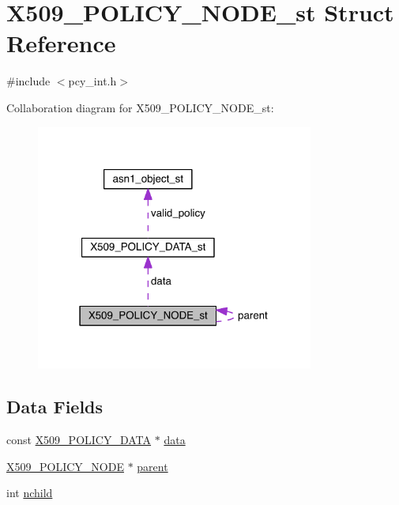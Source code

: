 \hypertarget{struct_x509___p_o_l_i_c_y___n_o_d_e__st}{}\section{X509\+\_\+\+P\+O\+L\+I\+C\+Y\+\_\+\+N\+O\+D\+E\+\_\+st Struct Reference}
\label{struct_x509___p_o_l_i_c_y___n_o_d_e__st}


{\ttfamily \#include $<$pcy\+\_\+int.\+h$>$}



Collaboration diagram for X509\+\_\+\+P\+O\+L\+I\+C\+Y\+\_\+\+N\+O\+D\+E\+\_\+st\+:\nopagebreak
\begin{figure}[H]
\begin{center}
\leavevmode
\includegraphics[width=259pt]{struct_x509___p_o_l_i_c_y___n_o_d_e__st__coll__graph}
\end{center}
\end{figure}
\subsection*{Data Fields}
\begin{DoxyCompactItemize}
\item 
const \hyperlink{pcy__int_8h_a0a96e7c084ee8bfa265612987136abd0}{X509\+\_\+\+P\+O\+L\+I\+C\+Y\+\_\+\+D\+A\+TA} $\ast$ \hyperlink{struct_x509___p_o_l_i_c_y___n_o_d_e__st_acc47c86faba298383084674e1f66ba39}{data}
\item 
\hyperlink{crypto_2ossl__typ_8h_a4fbb35756a73b47a3c4c86b5a6869f4d}{X509\+\_\+\+P\+O\+L\+I\+C\+Y\+\_\+\+N\+O\+DE} $\ast$ \hyperlink{struct_x509___p_o_l_i_c_y___n_o_d_e__st_acda0d8f1ad806d9e34318924fb335699}{parent}
\item 
int \hyperlink{struct_x509___p_o_l_i_c_y___n_o_d_e__st_ae005f9369d7412d4c3e8383844560a05}{nchild}
\end{DoxyCompactItemize}


